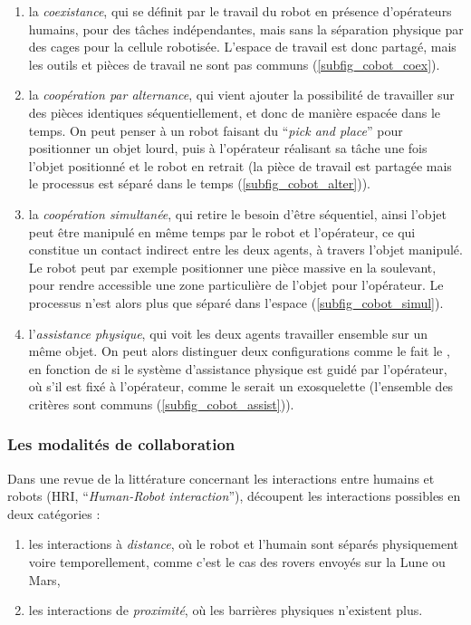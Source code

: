 \begin{enumerate}
	\item la \emph{coexistance}, qui se définit par le travail du robot en présence d'opérateurs humains, pour des tâches indépendantes, mais sans la séparation physique par des cages pour la cellule robotisée. L'espace de travail est donc partagé, mais les outils et pièces de travail ne sont pas communs (\cref{subfig_cobot_coex}).
	\item la \emph{coopération par alternance}, qui vient ajouter la possibilité de travailler sur des pièces identiques séquentiellement, et donc de manière espacée dans le temps. On peut penser à un robot faisant du \foreignquote{french}{\textit{pick and place}} pour positionner un objet lourd, puis à l'opérateur réalisant sa tâche une fois l'objet positionné et le robot en retrait (la pièce de travail est partagée mais le processus est séparé dans le temps (\cref{subfig_cobot_alter})).
	\item la \emph{coopération simultanée}, qui retire le besoin d'être séquentiel, ainsi l'objet peut être manipulé en même temps par le robot et l'opérateur, ce qui constitue un contact indirect entre les deux agents, à travers l'objet manipulé. Le robot peut par exemple positionner une pièce massive en la soulevant, pour rendre accessible une zone particulière de l'objet pour l'opérateur. Le processus n'est alors plus que séparé dans l'espace (\cref{subfig_cobot_simul}).
	\item l'\emph{assistance physique}, qui voit les deux agents travailler ensemble sur un même objet. On peut alors distinguer deux configurations comme le fait le \textcite{ministere_guide_2017}, en fonction de si le système d'assistance physique est guidé par l'opérateur, où s'il est fixé à l'opérateur, comme le serait un exosquelette (l'ensemble des critères sont communs (\cref{subfig_cobot_assist})).
\end{enumerate}



\subsubsection{Les modalités de collaboration}

Dans une revue de la littérature concernant les interactions entre humains et robots (HRI, \foreignquote{french}{\textit{Human-Robot interaction}}), \parencite{goodrich_humanrobot_2008} découpent les interactions possibles en deux catégories : 
\begin{enumerate}
	\item les interactions à \emph{distance}, où le robot et l'humain sont séparés physiquement voire temporellement, comme c'est le cas des rovers envoyés sur la Lune ou Mars,
	\item les interactions de \emph{proximité}, où les barrières physiques n'existent plus.
\end{enumerate}

